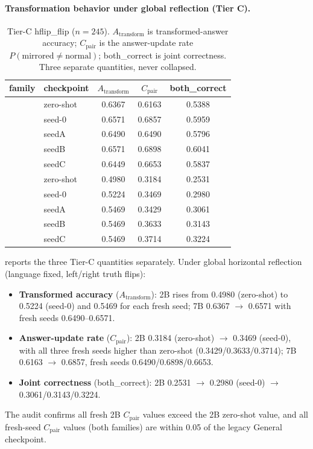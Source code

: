 \paragraph{Transformation behavior under global reflection (Tier C).}
\begin{table}[t]
\centering
\small
\begin{tabular}{llccc}
\toprule
family & checkpoint & $A_{\text{transform}}$ & $C_{\text{pair}}$ & both\_correct \\
\midrule
\qwen{} & zero-shot & 0.6367 & 0.6163 & 0.5388 \\
\qwen{} & seed-0 & 0.6571 & 0.6857 & 0.5959 \\
\qwen{} & seedA & 0.6490 & 0.6490 & 0.5796 \\
\qwen{} & seedB & 0.6571 & 0.6898 & 0.6041 \\
\qwen{} & seedC & 0.6449 & 0.6653 & 0.5837 \\
\smol{} & zero-shot & 0.4980 & 0.3184 & 0.2531 \\
\smol{} & seed-0 & 0.5224 & 0.3469 & 0.2980 \\
\smol{} & seedA & 0.5469 & 0.3429 & 0.3061 \\
\smol{} & seedB & 0.5469 & 0.3633 & 0.3143 \\
\smol{} & seedC & 0.5469 & 0.3714 & 0.3224 \\
\bottomrule
\end{tabular}
\caption{Tier-C hflip\_flip ($n=245$). $A_{\text{transform}}$ is
transformed-answer accuracy; $C_{\text{pair}}$ is the answer-update rate
$P(\text{mirrored}\neq\text{normal})$; both\_correct is joint correctness.
Three separate quantities, never collapsed.}
\label{tab:tierc}
\end{table}

 reports the three Tier-C quantities separately. Under
global horizontal reflection (language fixed, left/right truth flips):
\begin{itemize}[leftmargin=*]
  \item \textbf{Transformed accuracy} ($A_{\text{transform}}$): 2B rises
        from 0.4980 (zero-shot) to 0.5224 (seed-0) and 0.5469 for each
        fresh seed; 7B 0.6367 $\rightarrow$ 0.6571 with fresh seeds
        0.6490--0.6571.
  \item \textbf{Answer-update rate} ($C_{\text{pair}}$): 2B 0.3184
        (zero-shot) $\rightarrow$ 0.3469 (seed-0), with all three fresh
        seeds higher than zero-shot (0.3429/0.3633/0.3714); 7B 0.6163
        $\rightarrow$ 0.6857, fresh seeds 0.6490/0.6898/0.6653.
  \item \textbf{Joint correctness} (both\_correct): 2B 0.2531
        $\rightarrow$ 0.2980 (seed-0) $\rightarrow$ 0.3061/0.3143/0.3224.
\end{itemize}
The audit confirms all fresh 2B $C_{\text{pair}}$ values exceed the 2B
zero-shot value, and all fresh-seed $C_{\text{pair}}$ values (both
families) are within 0.05 of the legacy General checkpoint.

